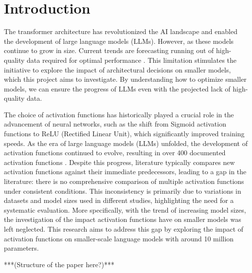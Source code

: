 
\section{Introduction} %


The transformer architecture \cite{Vaswani2017} has revolutionized the AI landscape and enabled the development of large language models (LLMs). However, as these models continue to grow in size. Current trends are forecasting running out of high-quality data required for optimal performance \cite{Villalobos2022}. This limitation stimulates the initiative to explore the impact of architectural decisions on smaller models, which this project aims to investigate. By understanding how to optimize smaller models, we can ensure the progress of LLMs even with the projected lack of high-quality data.

The choice of activation functions has historically played a crucial role in the advancement of neural networks, such as the shift from Sigmoid activation functions to ReLU (Rectified Linear Unit), which significantly improved training speeds. As the era of large language models (LLMs) unfolded, the development of activation functions continued to evolve, resulting in over 400 documented activation functions \cite{Kunc2024}. Despite this progress, literature typically compares new activation functions against their immediate predecessors, leading to a gap in the literature: there is no comprehensive comparison of multiple activation functions under consistent conditions. This inconsistency is primarily due to variations in datasets and model sizes used in different studies, highlighting the need for a systematic evaluation. More specifically, with the trend of increasing model sizes, the investigation of the impact activation functions have on smaller models was left neglected. This research aims to address this gap by exploring the impact of activation functions on smaller-scale language models with around 10 million parameters.

***(Structure of the paper here?)***